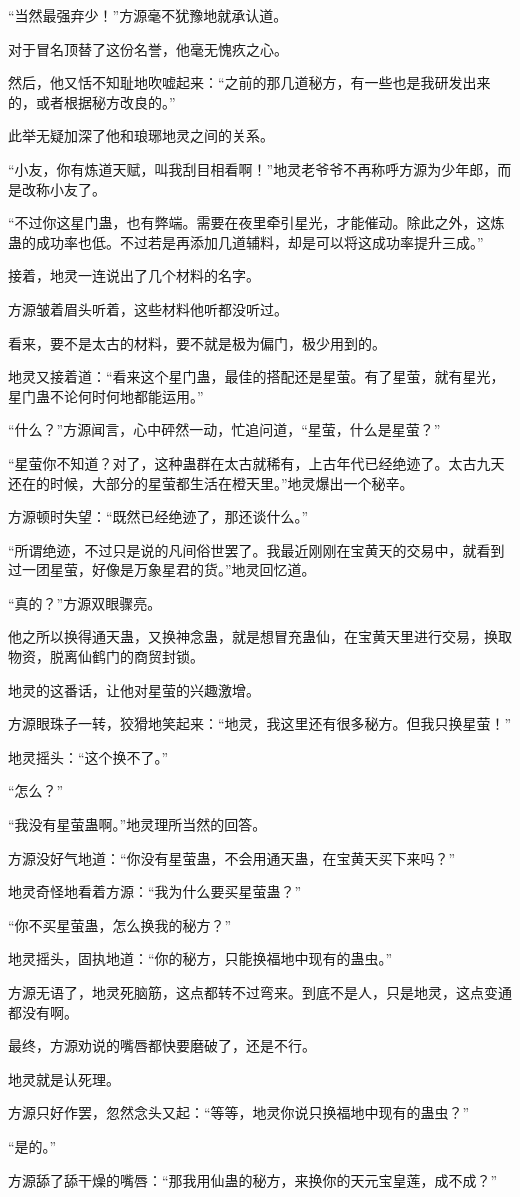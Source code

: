 \begin{this_body}
“当然最强弃少！”方源毫不犹豫地就承认道。

对于冒名顶替了这份名誉，他毫无愧疚之心。

然后，他又恬不知耻地吹嘘起来：“之前的那几道秘方，有一些也是我研发出来的，或者根据秘方改良的。”

此举无疑加深了他和琅琊地灵之间的关系。

“小友，你有炼道天赋，叫我刮目相看啊！”地灵老爷爷不再称呼方源为少年郎，而是改称小友了。

“不过你这星门蛊，也有弊端。需要在夜里牵引星光，才能催动。除此之外，这炼蛊的成功率也低。不过若是再添加几道辅料，却是可以将这成功率提升三成。”

接着，地灵一连说出了几个材料的名字。

方源皱着眉头听着，这些材料他听都没听过。

看来，要不是太古的材料，要不就是极为偏门，极少用到的。

地灵又接着道：“看来这个星门蛊，最佳的搭配还是星萤。有了星萤，就有星光，星门蛊不论何时何地都能运用。”

“什么？”方源闻言，心中砰然一动，忙追问道，“星萤，什么是星萤？”

“星萤你不知道？对了，这种蛊群在太古就稀有，上古年代已经绝迹了。太古九天还在的时候，大部分的星萤都生活在橙天里。”地灵爆出一个秘辛。

方源顿时失望：“既然已经绝迹了，那还谈什么。”

“所谓绝迹，不过只是说的凡间俗世罢了。我最近刚刚在宝黄天的交易中，就看到过一团星萤，好像是万象星君的货。”地灵回忆道。

“真的？”方源双眼骤亮。

他之所以换得通天蛊，又换神念蛊，就是想冒充蛊仙，在宝黄天里进行交易，换取物资，脱离仙鹤门的商贸封锁。

地灵的这番话，让他对星萤的兴趣激增。

方源眼珠子一转，狡猾地笑起来：“地灵，我这里还有很多秘方。但我只换星萤！”

地灵摇头：“这个换不了。”

“怎么？”

“我没有星萤蛊啊。”地灵理所当然的回答。

方源没好气地道：“你没有星萤蛊，不会用通天蛊，在宝黄天买下来吗？”

地灵奇怪地看着方源：“我为什么要买星萤蛊？”

“你不买星萤蛊，怎么换我的秘方？”

地灵摇头，固执地道：“你的秘方，只能换福地中现有的蛊虫。”

方源无语了，地灵死脑筋，这点都转不过弯来。到底不是人，只是地灵，这点变通都没有啊。

最终，方源劝说的嘴唇都快要磨破了，还是不行。

地灵就是认死理。

方源只好作罢，忽然念头又起：“等等，地灵你说只换福地中现有的蛊虫？”

“是的。”

方源舔了舔干燥的嘴唇：“那我用仙蛊的秘方，来换你的天元宝皇莲，成不成？”

\end{this_body}

